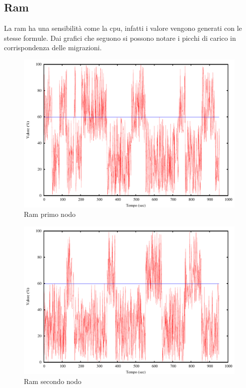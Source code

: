 \subsection{Ram}
La ram ha una sensibilità come la cpu, infatti i valore vengono generati con le stesse formule. Dai grafici che seguono si possono notare i picchi di carico in corrispondenza delle migrazioni.
\begin{figure}[H]
\begin{center}
\includegraphics[scale=0.6]{etc/ram1.pdf}
\caption{Ram primo nodo}
\label{fig:ram1}
\end{center}
\end{figure}
\begin{figure}[H]
\begin{center}
\includegraphics[scale=0.6]{etc/ram2.pdf}
\caption{Ram secondo nodo}
\label{fig:ram2}
\end{center}
\end{figure}
